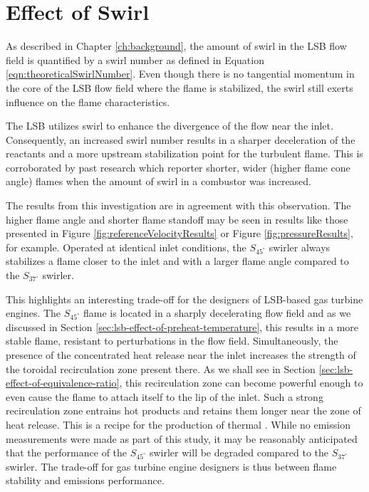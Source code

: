 \section{Effect of Swirl}
\label{sec:lsb-effect-of-swirl}

As described in Chapter \ref{ch:background}, the amount of swirl in the LSB flow field is quantified by a swirl number as defined in Equation \ref{eqn:theoreticalSwirlNumber}.
Even though there is no tangential momentum in the core of the LSB flow field where the flame is stabilized, the swirl still exerts influence on the flame characteristics.

The LSB utilizes swirl to enhance the divergence of the flow near the inlet.
Consequently, an increased swirl number results in a sharper deceleration of the reactants and a more upstream stabilization point for the turbulent flame.
This is corroborated by past research\cite{1986-starner,1992-chan} which reporter shorter, wider (higher flame cone angle) flames when the amount of swirl in a combustor was increased.

The results from this investigation are in agreement with this observation.
The higher flame angle and shorter flame standoff may be seen in results like those presented in Figure \ref{fig:referenceVelocityResults} or Figure \ref{fig:pressureResults}, for example.
Operated at identical inlet conditions, the \(S_{45^\circ}\) swirler always stabilizes a flame closer to the inlet and with a larger flame angle compared to the \(S_{37^\circ}\) swirler.

This highlights an interesting trade-off for the designers of LSB-based gas turbine engines.
The \(S_{45^\circ}\) flame is located in a sharply decelerating flow field and as we discussed in Section \ref{sec:lsb-effect-of-preheat-temperature}, this results in a more stable flame, resistant to perturbations in the flow field.
Simultaneously, the presence of the concentrated heat release near the inlet increases the strength of the toroidal recirculation zone present there.
As we shall see in Section \ref{sec:lsb-effect-of-equivalence-ratio}, this recirculation zone can become powerful enough to even cause the flame to attach itself to the lip of the inlet.
Such a strong recirculation zone entrains hot products and retains them longer near the zone of heat release.
This is a recipe for the production of thermal .
While no emission measurements were made as part of this study, it may be reasonably anticipated that the  performance of the \(S_{45^\circ}\) swirler will be degraded compared to the \(S_{37^\circ}\) swirler.
The trade-off for gas turbine engine designers is thus between flame stability and emissions performance.

